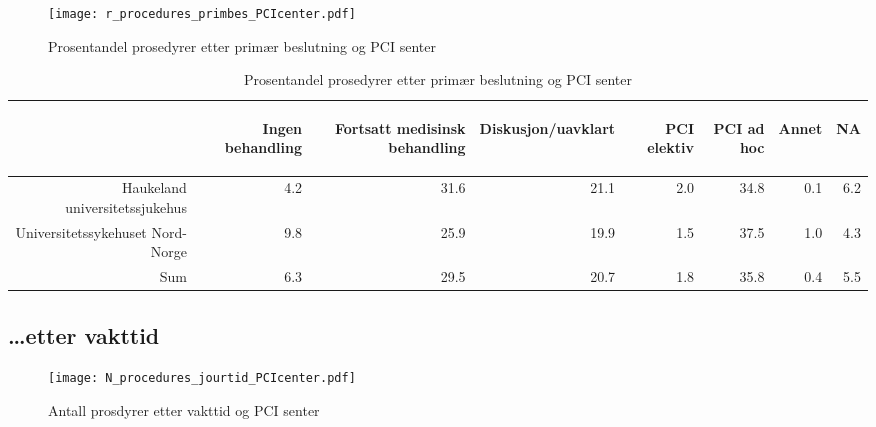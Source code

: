 \documentclass[norsk, a4paper]{report}
\begin{document}
\clearpage


\begin{figure}[ht]
  \centering
\texttt{[image: r\_procedures\_primbes\_PCIcenter.pdf]}  \caption{Prosentandel prosedyrer etter primær beslutning og PCI senter}
\end{figure}

\begin{tiny}
\begin{table}[ht]
\centering
\begin{tabular}{rrrrrrrr}
  \toprule
 & \begin{sideways} Ingen behandling \end{sideways} & \begin{sideways} Fortsatt medisinsk behandling \end{sideways} & \begin{sideways} Diskusjon/uavklart \end{sideways} & \begin{sideways} PCI elektiv \end{sideways} & \begin{sideways} PCI ad hoc \end{sideways} & \begin{sideways} Annet \end{sideways} & \begin{sideways} NA \end{sideways} \\ 
  \midrule
Haukeland universitetssjukehus & 4.2 & 31.6 & 21.1 & 2.0 & 34.8 & 0.1 & 6.2 \\ 
  Universitetssykehuset Nord-Norge & 9.8 & 25.9 & 19.9 & 1.5 & 37.5 & 1.0 & 4.3 \\ 
  Sum & 6.3 & 29.5 & 20.7 & 1.8 & 35.8 & 0.4 & 5.5 \\ 
   \bottomrule
\end{tabular}
\caption{Prosentandel prosedyrer etter primær beslutning og PCI senter} 
\end{table}\end{tiny}



\clearpage
\subsection{\ldots etter vakttid}


\begin{figure}[ht]
  \centering
\texttt{[image: N\_procedures\_jourtid\_PCIcenter.pdf]}  \caption{Antall prosdyrer etter vakttid og PCI senter}
\end{figure}
\end{document}
